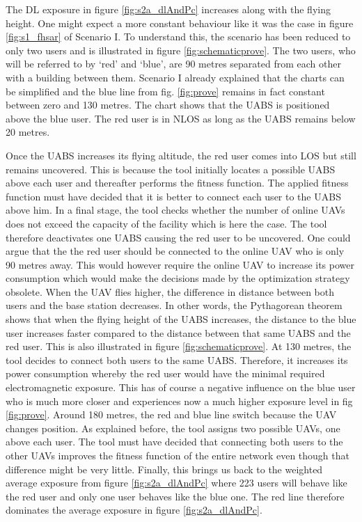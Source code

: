 The \gls{DL} exposure in figure \ref{fig:s2a_dlAndPc} increases along with the flying height. One might expect a more constant 
behaviour like it was the case in figure \ref{fig:s1_fhsar} of Scenario I. To understand this, the scenario has been reduced  
to only two users and is illustrated in figure \ref{fig:schematicprove}.
The two users, who will be referred to by `red' and `blue', are 90 metres separated from each other with a building between them.
Scenario I already explained that the charts can be simplified and the blue line from fig. \ref{fig:prove} remains in fact constant between zero and 130 metres.
The chart shows that the \gls{UABS} is positioned above the blue user. The red user is in \gls{NLOS} as long as the \gls{UABS} remains below 20 metres.

Once the \gls{UABS} increases its flying altitude, the red user comes into \gls{LOS} but still remains uncovered. This is because the tool initially locates a possible 
\gls{UABS} above each user and thereafter performs the  fitness function. The applied fitness function must have decided that it is better to connect 
each user to the \gls{UABS} above him. In a final stage, the tool checks whether the number of online \gls{UAV}s does not exceed the capacity of the facility
which is here the case. The tool therefore deactivates one \gls{UABS} causing the red user to be uncovered. One could argue that the 
the red user should be connected to the online \gls{UAV} who is only 90 metres away. This would however require the online \gls{UAV} to increase its power consumption which 
would make the decisions made by the optimization strategy obsolete.
When the \gls{UAV} flies higher, the difference in distance between both users and the base station decreases. In other words, the Pythagorean theorem shows that when the flying height of the 
\gls{UABS} increases, the distance to the blue user increases faster compared to the distance between that same \gls{UABS} and the red user. This is also illustrated in 
figure \ref{fig:schematicprove}.
At 130 metres, the tool decides to connect both users to the same \gls{UABS}. Therefore, it increases its power consumption whereby the red user would  have the minimal 
required electromagnetic exposure. This has of course a negative influence on the blue user who is much more closer and experiences now a much higher exposure level in fig \ref{fig:prove}.
Around 180 metres, the  red and blue line switch because the \gls{UAV} changes position. As explained before, the tool assigns two possible \gls{UAV}s, one above 
each user. The tool must have decided that connecting both users to the other \gls{UAV}s improves the fitness function of the entire network even though that difference might be 
very little.
Finally, this brings us back to the weighted average exposure from figure \ref{fig:s2a_dlAndPc} where 223 users will behave like the  red user and only
one user behaves like the blue one. 
The red line therefore dominates the average exposure in figure \ref{fig:s2a_dlAndPc}.

